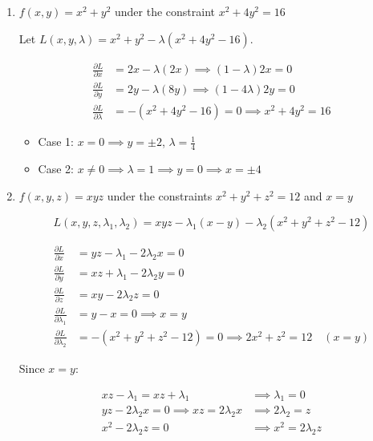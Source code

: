 \documentclass[10pt,\jkfside,a4paper]{article}
\newcommand{\answer}[1]{
    \begin{tcolorbox}[colframe=black, colback=white, sharp corners, boxrule=0.2mm, breakable]
        #1
    \end{tcolorbox}
}
\begin{document}
\begin{enumerate}
\begin{enumerate}
        \item
        $f(x, y) = x^2 + y^2$ under the constraint $x^2 + 4y^2 = 16$

        \answer{
            Let $L(x, y, \lambda) = x^2 + y^2 - \lambda(x^2 + 4y^2 - 16)$.

            \begin{align*}
                \frac{\partial L}{\partial x} &= 2x - \lambda(2x) \implies (1 - \lambda) 2x = 0 \\
                \frac{\partial L}{\partial y} &= 2y - \lambda(8y) \implies (1 - 4\lambda) 2y = 0 \\
                \frac{\partial L}{\partial \lambda} &= -(x^2 + 4y^2 - 16) = 0 \implies x^2 + 4y^2 = 16
            \end{align*}

            \begin{itemize}
                \item Case 1: $x = 0 \implies y = \pm 2$, $\lambda = \frac{1}{4}$
                \item Case 2: $x \neq 0 \implies \lambda = 1 \implies y = 0 \implies x = \pm 4$
            \end{itemize}
        }

        \item
        $f(x, y, z) = xyz$ under the constraints $x^2 + y^2 + z^2 = 12$ and $x = y$

        \answer{
            \[
                L(x, y, z, \lambda_1, \lambda_2) = xyz - \lambda_1(x - y) - \lambda_2(x^2 + y^2 + z^2 - 12)
            \]

            \begin{align*}
                \frac{\partial L}{\partial x} &= yz - \lambda_1 - 2\lambda_2 x = 0 \\
                \frac{\partial L}{\partial y} &= xz + \lambda_1 - 2\lambda_2 y = 0 \\
                \frac{\partial L}{\partial z} &= xy - 2\lambda_2 z = 0 \\
                \frac{\partial L}{\partial \lambda_1} &= y - x = 0 \implies x = y \\
                \frac{\partial L}{\partial \lambda_2} &= -(x^2 + y^2 + z^2 - 12) = 0 \implies 2x^2 + z^2 = 12 \quad (x = y)
            \end{align*}

            Since $x = y$:

            \begin{align*}
                xz - \lambda_1 = xz + \lambda_1 &\implies \lambda_1 = 0 \\
                yz - 2\lambda_2 x = 0 \implies xz = 2\lambda_2 x &\implies 2\lambda_2 = z \\
                x^2 - 2\lambda_2 z = 0 &\implies x^2 = 2\lambda_2 z
            \end{align*}

}
\end{enumerate}
\end{enumerate}
\end{document}
